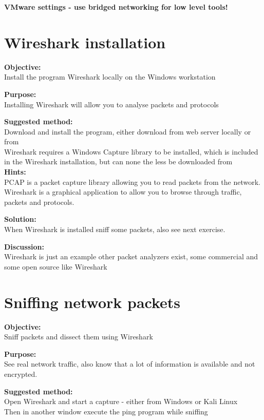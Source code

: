 \documentclass[a4paper,11pt,notitlepage]{report}
\begin{document}
{\bf VMware settings - use bridged networking for low level tools!}

\chapter{Wireshark installation}
\label{ex:wireshark}



{\bf Objective:}\\
Install the program Wireshark locally on the Windows workstation

{\bf Purpose:}\\
Installing Wireshark will allow you to analyse packets and protocols

{\bf Suggested method:}\\
Download and install the program, either download from web server locally or from \\
Wireshark requires a Windows Capture library to be installed, which is included in the
Wireshark installation, but can none the less be downloaded from\\

{\bf Hints:}\\
PCAP is a packet capture library allowing you to read packets from the network. Wireshark is a graphical application to allow you to browse through traffic, packets and protocols.

{\bf Solution:}\\
When Wireshark is installed sniff some packets, also see next exercise.

{\bf Discussion:}\\
Wireshark is just an example other packet analyzers exist, some commercial and some open source like Wireshark

\chapter{Sniffing network packets}
\label{ex:wireshark-sniff}

{\bf Objective:}\\
Sniff packets and dissect them using Wireshark

{\bf Purpose:}\\
See real network traffic, also know that a lot of information is available and not encrypted.

{\bf Suggested method:}\\
Open Wireshark and start a capture - either from Windows or Kali Linux\\
Then in another window execute the ping program while sniffing
\end{document}
